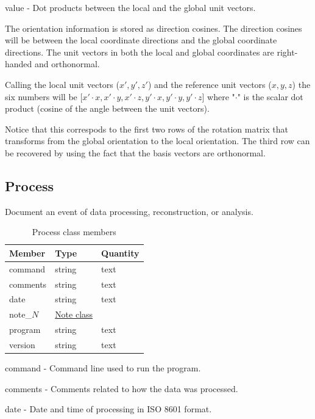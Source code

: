 \documentclass[usletter,11pt]{article}
\newcommand{\member}[2]
{ \noindent
{ \color{softBlue}  #1 - } #2
\vspace{0.2cm}
}
\begin{document}
\member{value}{Dot products between the local and the global unit vectors.}

The orientation information is stored as direction cosines. The
direction cosines will be between the local coordinate directions and
the global coordinate directions. The unit vectors in both the
local and global coordinates are right-handed and orthonormal. 

Calling the local unit vectors ($x',y',z'$) and the reference unit vectors
($x,y,z$) the six numbers will be [$x' \cdot x, x' \cdot y, x' \cdot z, y' \cdot
x, y'  \cdot y, y' \cdot z$] where "$\cdot$" is the scalar dot product (cosine
of the angle between the unit vectors). 

Notice that this correspods to the first two rows of the rotation
matrix that transforms from the global orientation to the local
orientation. The third row can be recovered by using the fact that the
basis vectors are orthonormal.

\subsection{Process}
\label{table:process}

Document an event of data processing, reconstruction, or analysis.

\begin{table}[h!]\sffamily \footnotesize
\caption{Process class members}

\begin{tabular}{p{4.5cm} p{4.5cm}  p{2.5cm} }
\toprule
\bfseries Member     & \bfseries Type & \bfseries Quantity \\
\midrule
command & string & text \\
comments & string & text \\
date & string & text \\
note\_$N$ &  \hyperref[table:note]{Note class} & \\
program & string & text \\
version & string & text \\
\bottomrule
\end{tabular}
\end{table}

\member{command}{Command line used to run the program.}

\member{comments}{Comments related to how the data was processed.}

\member{date}{Date and time of processing in ISO 8601 format.}
\end{document}
